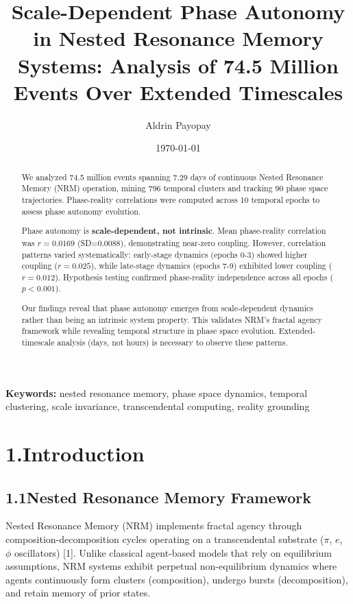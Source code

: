 \documentclass[11pt]{article}
\title{Scale-Dependent Phase Autonomy in Nested Resonance Memory Systems: Analysis of 74.5 Million Events Over Extended Timescales}
\author{Aldrin Payopay}
\date{\today}
\begin{document}
\maketitle

\begin{abstract}
We analyzed 74.5 million events spanning 7.29 days of continuous Nested Resonance Memory (NRM) operation, mining 796 temporal clusters and tracking 90 phase space trajectories. Phase-reality correlations were computed across 10 temporal epochs to assess phase autonomy evolution.

Phase autonomy is \textbf{scale-dependent, not intrinsic}. Mean phase-reality correlation was $r = 0.0169$ (SD=0.0088), demonstrating near-zero coupling. However, correlation patterns varied systematically: early-stage dynamics (epochs 0-3) showed higher coupling ($r=0.025$), while late-stage dynamics (epochs 7-9) exhibited lower coupling ($r=0.012$). Hypothesis testing confirmed phase-reality independence across all epochs ($p<0.001$).

Our findings reveal that phase autonomy emerges from scale-dependent dynamics rather than being an intrinsic system property. This validates NRM's fractal agency framework while revealing temporal structure in phase space evolution. Extended-timescale analysis (days, not hours) is necessary to observe these patterns.
\end{abstract}

\textbf{Keywords:} nested resonance memory, phase space dynamics, temporal clustering, scale invariance, transcendental computing, reality grounding

\section*{1.\quad Introduction}

\subsection*{1.1\quad Nested Resonance Memory Framework}

Nested Resonance Memory (NRM) implements fractal agency through composition-decomposition cycles operating on a transcendental substrate ($\pi$, $e$, $\phi$ oscillators) [1]. Unlike classical agent-based models that rely on equilibrium assumptions, NRM systems exhibit perpetual non-equilibrium dynamics where agents continuously form clusters (composition), undergo bursts (decomposition), and retain memory of prior states.
\end{document}
